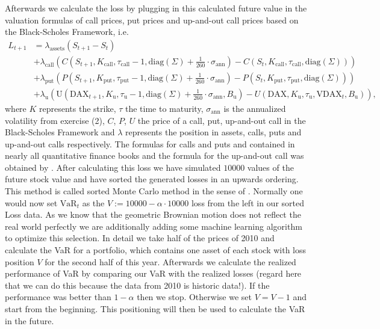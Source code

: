 \documentclass[10pt,a4paper]{article}
\theoremstyle{definition}
\begin{document}
Afterwards we calculate the loss by plugging in this calculated future value in the valuation formulas of call prices, put prices and up-and-out call prices based on the Black-Scholes Framework, i.e.
	\begin{align*}
			L_{t+1}&=\lambda_{\mathrm{assets}} (S_{t+1}-S_t)\\
			&+\lambda_{\mathrm{call}} 
				\left(C\left(S_{t+1},K_{\mathrm{call}},\tau_{\mathrm{call}}-1,\mathrm{diag}(\Sigma)+\frac{1}{260}\cdot\sigma_\mathrm{ann}\right)
				-C(S_{t},K_{\mathrm{call}},\tau_{\mathrm{call}},\mathrm{diag}(\Sigma))\right)\\
			&+\lambda_{\mathrm{put}} 
				\left(P\left(S_{t+1},K_{\mathrm{put}},\tau_{\mathrm{put}}-1,\mathrm{diag}(\Sigma)+\frac{1}{260}\cdot\sigma_\mathrm{ann}\right)
				-P(S_{t},K_{\mathrm{put}},\tau_{\mathrm{put}},\mathrm{diag}(\Sigma))\right)\\
				&+\lambda_{\mathrm{u}} 
				\left(\mathrm{U}\left(\mathrm{DAX}_{t+1},K_{\mathrm{u}},\tau_{\mathrm{u}}-1,\mathrm{diag}(\Sigma)+\frac{1}{260}\cdot\sigma_\mathrm{ann}
				,B_{\mathrm{u}}\right)
				-U(\mathrm{DAX},K_{\mathrm{u}},\tau_{\mathrm{u}},\mathrm{VDAX}_t
				,B_{\mathrm{u}})\right),
	\end{align*}
	where $K$ represents the strike, $\tau$ the time to maturity, 	
	$\sigma_\mathrm{ann}$	is the annualized volatility from exercise (2), $C$, $P$, $U$ the price of a call, put, up-and-out call in the Black-Scholes Framework and $\lambda$ represents the position in assets, calls, puts and up-and-out calls respectively. The formulas for calls and puts and contained in nearly all quantitative finance books and the formula for the up-and-out call was obtained by \cite{CLS94}. After calculating this loss we have simulated
	$10000$ values of the future stock value and have sorted the generated losses in an upwards ordering. This method is called sorted Monte Carlo method in the sense of \cite{JK16}. Normally one would now set
	$\mathrm{VaR}_t$ as the $V:=10000-\alpha\cdot 10000$ loss from the left in our sorted Loss data. As we know that the geometric Brownian motion does not reflect the real world perfectly we are additionally adding some machine learning algorithm to optimize this selection. In detail we take half of the prices of 2010 and calculate the VaR for a portfolio, which contains one asset of each stock with loss position $V$ for the second half of this year. Afterwards we calculate the realized performance of VaR by comparing our VaR with the realized losses (regard here that we can do this because the data from 2010 is historic data!). If the performance was better than $1-\alpha$ then we stop. Otherwise we set $V=V-1$ and start from the beginning. This positioning will then be used to calculate the VaR in the future.
		
	



\end{document}
